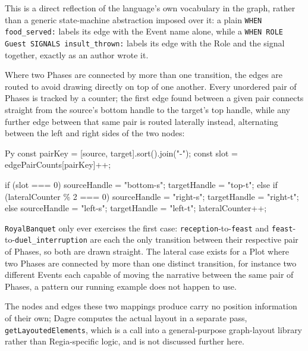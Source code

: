 This is a direct reflection of the language's own vocabulary in the graph, rather than a generic state-machine abstraction imposed over it: a plain \lstinline|WHEN food_served:| labels its edge with the Event name alone, while a \lstinline|WHEN ROLE Guest SIGNALS insult_thrown:| labels its edge with the Role and the signal together, exactly as an author wrote it.

Where two Phases are connected by more than one transition, the edges are routed to avoid drawing directly on top of one another. Every unordered pair of Phases is tracked by a counter; the first edge found between a given pair connects straight from the source's bottom handle to the target's top handle, while any further edge between that same pair is routed laterally instead, alternating between the left and right sides of the two nodes:
\begin{codeblock}[]{Py}
const pairKey = [source, target].sort().join("-");
const slot = edgePairCounts[pairKey]++;

if (slot === 0) {
    sourceHandle = "bottom-s"; targetHandle = "top-t";
} else {
    if (lateralCounter \% 2 === 0) { sourceHandle = "right-s"; targetHandle = "right-t"; }
    else                          { sourceHandle = "left-s";  targetHandle = "left-t";  }
    lateralCounter++;
}
\end{codeblock}
\lstinline|RoyalBanquet| only ever exercises the first case: \lstinline|reception|-to-\lstinline|feast| and \lstinline|feast|-to-\lstinline|duel_interruption| are each the only transition between their respective pair of Phases, so both are drawn straight. The lateral case exists for a Plot where two Phases are connected by more than one distinct transition, for instance two different Events each capable of moving the narrative between the same pair of Phases, a pattern our running example does not happen to use.

The nodes and edges these two mappings produce carry no position information of their own; Dagre computes the actual layout in a separate pass, \lstinline|getLayoutedElements|, which is a call into a general-purpose graph-layout library rather than Regia-specific logic, and is not discussed further here.

